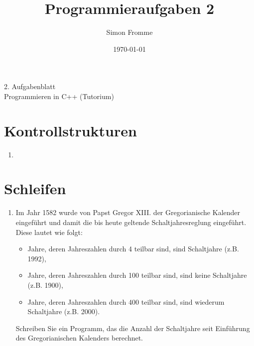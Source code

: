 \documentclass[paper=a4, fontsize=11pt, twoside]{scrartcl}
\title{Programmieraufgaben 2}
\author{Simon Fromme}
\date{\normalsize\today}
\begin{document}
\vspace*{0.75\baselineskip}
\begin{center}
  \Large 2. Aufgabenblatt \\\vspace{0.5em} \large Programmieren in C++ (Tutorium)
\end{center}

\section*{Kontrollstrukturen}
\begin{enumerate}
\item 
\end{enumerate}

\section*{Schleifen}
\begin{enumerate}[resume]
 \item Im Jahr 1582 wurde von  Papst Gregor XIII. der Gregorianische Kalender eingeführt und damit die bis heute geltende Schaltjahresreglung eingeführt. Diese lautet wie folgt:
   \begin{itemize}
   \item Jahre, deren Jahreszahlen durch 4 teilbar sind, sind Schaltjahre (z.B. 1992), 
   \item Jahre, deren Jahreszahlen durch 100 teilbar sind, sind keine Schaltjahre (z.B. 1900), 
   \item Jahre, deren Jahreszahlen durch 400 teilbar sind, sind wiederum Schaltjahre (z.B. 2000).
   \end{itemize}
   Schreiben Sie ein Programm, das die Anzahl der Schaltjahre seit Einführung des Gregorianischen Kalenders berechnet.
\end{enumerate}
\end{document}
